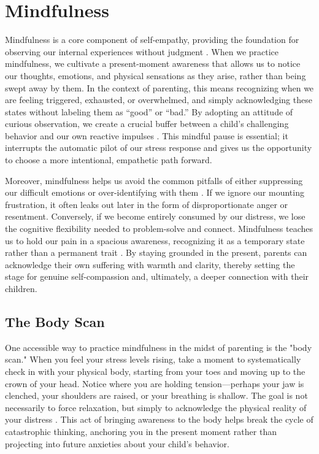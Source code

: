 \section{Mindfulness}

Mindfulness is a core component of self-empathy, providing the foundation for observing our internal experiences without judgment \citep{neff2003}.
When we practice mindfulness, we cultivate a present-moment awareness that allows us to notice our thoughts, emotions, and physical sensations as they arise, rather than being swept away by them.
In the context of parenting, this means recognizing when we are feeling triggered, exhausted, or overwhelmed, and simply acknowledging these states without labeling them as ``good'' or ``bad.''
By adopting an attitude of curious observation, we create a crucial buffer between a child's challenging behavior and our own reactive impulses \citep{siegel2011}.
This mindful pause is essential; it interrupts the automatic pilot of our stress response and gives us the opportunity to choose a more intentional, empathetic path forward.

Moreover, mindfulness helps us avoid the common pitfalls of either suppressing our difficult emotions or over-identifying with them \citep{neff2003}.
If we ignore our mounting frustration, it often leaks out later in the form of disproportionate anger or resentment.
Conversely, if we become entirely consumed by our distress, we lose the cognitive flexibility needed to problem-solve and connect.
Mindfulness teaches us to hold our pain in a spacious awareness, recognizing it as a temporary state rather than a permanent trait \citep{lazarus1991}.
By staying grounded in the present, parents can acknowledge their own suffering with warmth and clarity, thereby setting the stage for genuine self-compassion and, ultimately, a deeper connection with their children.

\subsection{The Body Scan}
One accessible way to practice mindfulness in the midst of parenting is the "body scan."
When you feel your stress levels rising, take a moment to systematically check in with your physical body, starting from your toes and moving up to the crown of your head.
Notice where you are holding tension---perhaps your jaw is clenched, your shoulders are raised, or your breathing is shallow.
The goal is not necessarily to force relaxation, but simply to acknowledge the physical reality of your distress \citep{kabat2003}.
This act of bringing awareness to the body helps break the cycle of catastrophic thinking, anchoring you in the present moment rather than projecting into future anxieties about your child's behavior.

